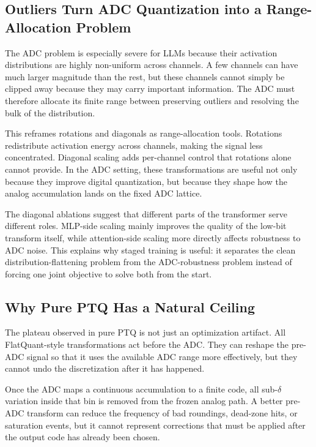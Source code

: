 \documentclass[a4paper,11pt,oneside]{article}
\theoremstyle{breakstyle}
\begin{document}
  \subsection{Outliers Turn ADC Quantization into a Range-Allocation Problem}

  The ADC problem is especially severe for LLMs because their activation
  distributions are highly non-uniform across channels.  A few channels
  can have much larger magnitude than the rest, but these channels cannot
  simply be clipped away because they may carry important information.
  The ADC must therefore allocate its finite range between preserving
  outliers and resolving the bulk of the distribution.

  This reframes rotations and diagonals as range-allocation tools.
  Rotations redistribute activation energy across channels, making the
  signal less concentrated.  Diagonal scaling adds per-channel control
  that rotations alone cannot provide.  In the ADC setting, these
  transformations are useful not only because they improve digital
  quantization, but because they shape how the analog accumulation lands
  on the fixed ADC lattice.

  The diagonal ablations suggest that different parts of the transformer
  serve different roles.  MLP-side scaling mainly improves the quality of
  the low-bit transform itself, while attention-side scaling more
  directly affects robustness to ADC noise.  This explains why staged
  training is useful: it separates the clean distribution-flattening
  problem from the ADC-robustness problem instead of forcing one joint
  objective to solve both from the start.

  \subsection{Why Pure PTQ Has a Natural Ceiling}

  The plateau observed in pure PTQ is not just an optimization artifact.
  All FlatQuant-style transformations act before the ADC.  They can
  reshape the pre-ADC signal so that it uses the available ADC range more
  effectively, but they cannot undo the discretization after it has
  happened.

  Once the ADC maps a continuous accumulation to a finite code, all
  sub-\(\delta\) variation inside that bin is removed from the frozen
  analog path.  A better pre-ADC transform can reduce the frequency of
  bad roundings, dead-zone hits, or saturation events, but it cannot
  represent corrections that must be applied after the output code has
  already been chosen.
\end{document}
